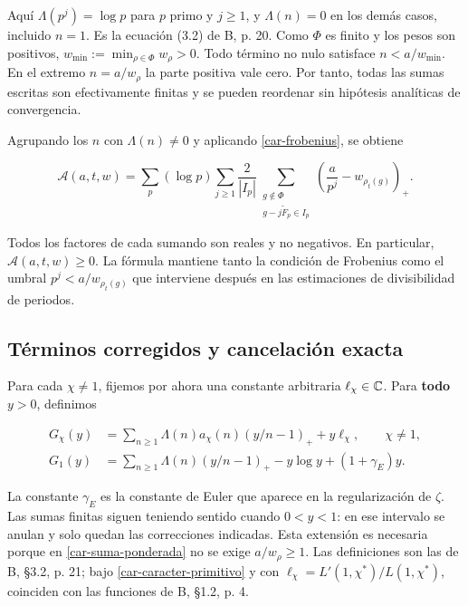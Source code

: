 Aquí $\Lambda(p^j)=\log p$ para $p$ primo y $j\ge1$, y $\Lambda(n)=0$ en los demás casos, incluido $n=1$. Es la ecuación (3.2) de B, p. 20. Como $\Phi$ es finito y los pesos son positivos, $w_{\min}:=\min_{\rho\in\Phi}w_\rho>0$. Todo término no nulo satisface $n<a/w_{\min}$. En el extremo $n=a/w_\rho$ la parte positiva vale cero. Por tanto, todas las sumas escritas son efectivamente finitas y se pueden reordenar sin hipótesis analíticas de convergencia.

Agrupando los $n$ con $\Lambda(n)\ne0$ y aplicando \eqref{car-frobenius}, se obtiene

\begin{equation}
\mathcal A(a,t,w)
=\sum_p(\log p)\sum_{j\ge1}
\frac2{|I_p|}
\sum_{\substack{g\notin\Phi\\g-j\widetilde F_p\in I_p}}
\left(\frac a{p^j}-w_{\rho_t(g)}\right)_+.
\label{car-suma-positiva}
\end{equation}

Todos los factores de cada sumando son reales y no negativos. En particular, $\mathcal A(a,t,w)\ge0$. La fórmula mantiene tanto la condición de Frobenius como el umbral $p^j<a/w_{\rho_t(g)}$ que interviene después en las estimaciones de divisibilidad de periodos.

\subsection{Términos corregidos y cancelación exacta}

Para cada $\chi\ne1$, fijemos por ahora una constante arbitraria $\ell_\chi\in\mathbb{C}$. Para \textbf{todo} $y>0$, definimos

\begin{equation}
\begin{aligned}
G_\chi(y)
&=\sum_{n\ge1}\Lambda(n)a_\chi(n)(y/n-1)_+
+y\ell_\chi,\qquad \chi\ne1,\\
G_1(y)
&=\sum_{n\ge1}\Lambda(n)(y/n-1)_+
-y\log y+(1+\gamma_E)y.
\end{aligned}
\label{car-sumas-corregidas}
\end{equation}

La constante $\gamma_E$ es la constante de Euler que aparece en la regularización de $\zeta$. Las sumas finitas siguen teniendo sentido cuando $0<y<1$: en ese intervalo se anulan y solo quedan las correcciones indicadas. Esta extensión es necesaria porque en \eqref{car-suma-ponderada} no se exige $a/w_\rho\ge1$. Las definiciones son las de B, §3.2, p. 21; bajo \eqref{car-caracter-primitivo} y con $\ell_\chi=L'(1,\chi^*)/L(1,\chi^*)$, coinciden con las funciones de B, §1.2, p. 4.

